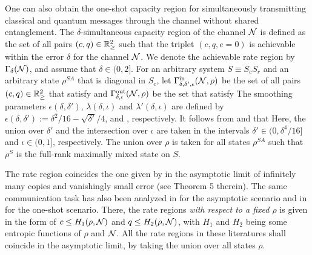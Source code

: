 \documentclass[journal]{IEEEtran}
\begin{document}
One can also obtain the one-shot capacity region for simultaneously transmitting classical and quantum messages through the channel without shared entanglement. 
The $\delta$-simultaneous capacity region of the channel ${\mathcal N}$ is defined as the set of all pairs $(c,q)\in{\mathbb R}_\geq^2$ such that the triplet $(c,q,e=0)$ is achievable within the error $\delta$ for the channel ${\mathcal N}$. 
We denote the achievable rate region by $\Gamma_\delta({\mathcal N})$, and assume that $\delta\in(0,2]$. 
For an arbitrary system $S\equiv S_cS_r$ and an arbitrary state $\rho^{SA}$ that is diagonal in $S_c$, let $\Gamma_{\delta,\delta',\epsilon}^{\rm in}({\mathcal N},\rho)$ be the set of all pairs $(c,q)\in{\mathbb R}_\geq^2$ that satisfy
and $\Gamma_{\delta,\iota}^{\rm out}({\mathcal N},\rho)$ be the set that satisfy
The smoothing parameters $\epsilon(\delta,\delta')$, $\lambda(\delta,\iota)$ and $\lambda'(\delta,\iota)$ are defined by $\epsilon(\delta,\delta'):=\delta^2/16-\sqrt{\delta'}/4$,  and , respectively.
It follows from  and  that
Here, the union over $\delta'$ and the intersection over $\iota$ are taken in the intervals $\delta'\in(0,\delta^4/16]$ and $\iota\in(0,1]$, respectively.
The union over $\rho$ is taken for all states $\rho^{SA}$ such that $\rho^S$ is the full-rank maximally mixed state on $S$.


The rate region  coincides the one given by \cite{hsieh2010entanglement} in the asymptotic limit of infinitely many copies and vanishingly small error (see Theorem 5 therein).
The same communication task has also been analyzed in \cite{devetak2005capacity} for the asymptotic scenario and in \cite{salek2019one} for the one-shot scenario. 
There, the rate regions {\it with respect to a fixed $\rho$} is given in the form of $c\leq H_1(\rho,{\mathcal N})$ and $q\leq H_2(\rho,{\mathcal N})$, with $H_1$ and $H_2$ being some entropic functions of $\rho$ and ${\mathcal N}$.
All the rate regions in these literatures shall coincide in the asymptotic limit, by taking the union over all states $\rho$.
\end{document}

